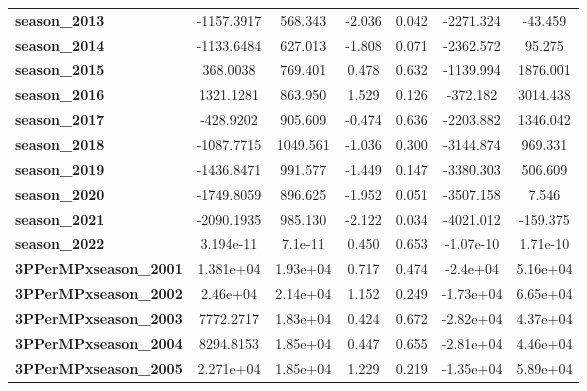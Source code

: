 \begin{center}
\begin{tabular}{lcccccc}
\textbf{season\_2013}         &   -1157.3917  &      568.343     &    -2.036  &         0.042        &    -2271.324    &      -43.459     \\
\textbf{season\_2014}         &   -1133.6484  &      627.013     &    -1.808  &         0.071        &    -2362.572    &       95.275     \\
\textbf{season\_2015}         &     368.0038  &      769.401     &     0.478  &         0.632        &    -1139.994    &     1876.001     \\
\textbf{season\_2016}         &    1321.1281  &      863.950     &     1.529  &         0.126        &     -372.182    &     3014.438     \\
\textbf{season\_2017}         &    -428.9202  &      905.609     &    -0.474  &         0.636        &    -2203.882    &     1346.042     \\
\textbf{season\_2018}         &   -1087.7715  &     1049.561     &    -1.036  &         0.300        &    -3144.874    &      969.331     \\
\textbf{season\_2019}         &   -1436.8471  &      991.577     &    -1.449  &         0.147        &    -3380.303    &      506.609     \\
\textbf{season\_2020}         &   -1749.8059  &      896.625     &    -1.952  &         0.051        &    -3507.158    &        7.546     \\
\textbf{season\_2021}         &   -2090.1935  &      985.130     &    -2.122  &         0.034        &    -4021.012    &     -159.375     \\
\textbf{season\_2022}         &    3.194e-11  &      7.1e-11     &     0.450  &         0.653        &    -1.07e-10    &     1.71e-10     \\
\textbf{3PPerMPxseason\_2001} &    1.381e+04  &     1.93e+04     &     0.717  &         0.474        &     -2.4e+04    &     5.16e+04     \\
\textbf{3PPerMPxseason\_2002} &     2.46e+04  &     2.14e+04     &     1.152  &         0.249        &    -1.73e+04    &     6.65e+04     \\
\textbf{3PPerMPxseason\_2003} &    7772.2717  &     1.83e+04     &     0.424  &         0.672        &    -2.82e+04    &     4.37e+04     \\
\textbf{3PPerMPxseason\_2004} &    8294.8153  &     1.85e+04     &     0.447  &         0.655        &    -2.81e+04    &     4.46e+04     \\
\textbf{3PPerMPxseason\_2005} &    2.271e+04  &     1.85e+04     &     1.229  &         0.219        &    -1.35e+04    &     5.89e+04     \\

\end{tabular}
\end{center}
